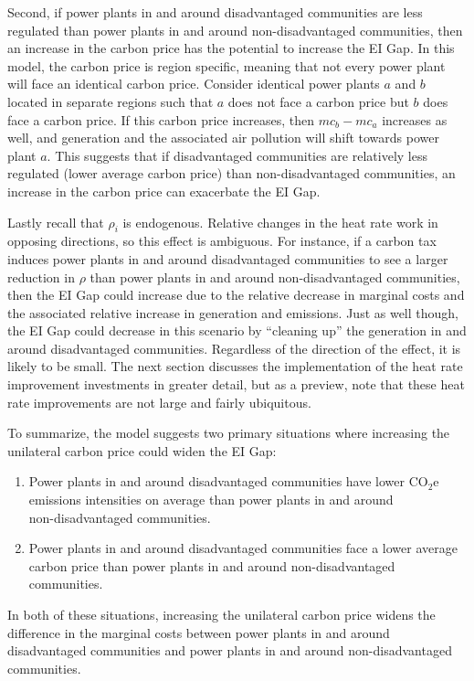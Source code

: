 Second, if power plants in and around disadvantaged communities are less regulated than power plants in and around non-disadvantaged communities, then an increase in the carbon price has the potential to increase the EI Gap. In this model, the carbon price is region specific, meaning that not every power plant will face an identical carbon price. Consider identical power plants $a$ and $b$ located in separate regions such that $a$ does not face a carbon price but $b$ does face a carbon price. If this carbon price increases, then $mc_{b} - mc_a$ increases as well, and generation and the associated air pollution will shift towards power plant $a$. This suggests that if disadvantaged communities are relatively less regulated (lower average carbon price) than non-disadvantaged communities, an increase in the carbon price can exacerbate the EI Gap.

Lastly recall that $\rho_i$ is endogenous. Relative changes in the heat rate work in opposing directions, so this effect is ambiguous. For instance, if a carbon tax induces power plants in and around disadvantaged communities to see a larger reduction in $\rho$ than power plants in and around non-disadvantaged communities, then the EI Gap could increase due to the relative decrease in marginal costs and the associated relative increase in generation and emissions. Just as well though, the EI Gap could decrease in this scenario by ``cleaning up'' the generation in and around disadvantaged communities. Regardless of the direction of the effect, it is likely to be small. The next section discusses the implementation of the heat rate improvement investments in greater detail, but as a preview, note that these heat rate improvements are not large and fairly ubiquitous. 

To summarize, the model suggests two primary situations where increasing the unilateral carbon price could widen the EI Gap:
\begin{enumerate}
    \item Power plants in and around disadvantaged communities have lower CO$_2$e emissions intensities on average than power plants in and around\\ non-disadvantaged communities.
    \item Power plants in and around disadvantaged communities face a lower average carbon price than power plants in and around non-disadvantaged communities. 
\end{enumerate}
In both of these situations, increasing the unilateral carbon price widens the difference in the marginal costs between power plants in and around disadvantaged communities and power plants in and around non-disadvantaged communities. 


